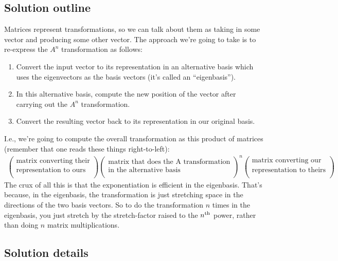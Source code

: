 \begin{lemma}
\subsection*{Solution outline}

Matrices represent transformations, so we can talk about them as taking in some
vector and producing some other vector. The approach we're going to take is to
re-express the $A^n$ transformation as follows:

\begin{enumerate}
\item Convert the input vector to its representation in an alternative basis which uses the
  eigenvectors as the basis vectors (it's called an ``eigenbasis'').
\item In this alternative basis, compute the new position of the vector after carrying out the
  $A^n$ transformation.
\item Convert the resulting vector back to its representation in our original basis.
\end{enumerate}

I.e., we're going to compute the overall transformation as this product of
matrices (remember that one reads these things right-to-left):
\begin{align*}
  \begin{pmatrix}\text{matrix converting their}\\\text{representation to ours} \\ \end{pmatrix}
  \begin{pmatrix}\text{matrix that does the A transformation}\\\text{in the alternative basis} \\ \end{pmatrix}^n
  \begin{pmatrix}\text{matrix converting our}\\\text{representation to theirs} \\ \end{pmatrix}
\end{align*}
The crux of all this is that the exponentiation is efficient in the
eigenbasis. That's because, in the eigenbasis, the transformation is just
stretching space in the directions of the two basis vectors. So to do the
transformation $n$ times in the eigenbasis, you just stretch by the
stretch-factor raised to the $n^{\text{th}}$ power, rather than doing $n$ matrix
multiplications.

\subsection*{Solution details}


\end{lemma}
